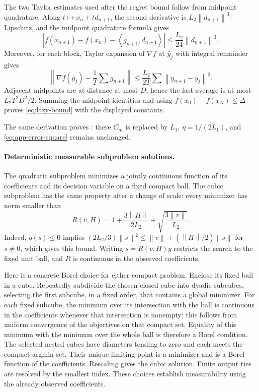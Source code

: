 \documentclass[11pt]{article}
\theoremstyle{remark}
\theoremstyle{remark}
\newcommand{\norm}[1]{\left\lVert#1\right\rVert}
\newcommand{\ip}[2]{\left\langle#1,#2\right\rangle}
\begin{document}
The two Taylor estimates used after the regret bound follow from midpoint
quadrature. Along $t\mapsto x_n+td_{n+1}$, the second derivative is
$L_2\norm{d_{n+1}}^3$-Lipschitz, and the midpoint quadrature formula gives
\[
 \left|f(x_{n+1})-f(x_n)-\ip{g_{n+1}}{d_{n+1}}\right|
 \le \frac{L_2}{24}\norm{d_{n+1}}^3.
\]
Moreover, for each block, Taylor expansion of $\nabla f$ at $\bar y_j$
with integral remainder gives
\[
 \left\|\nabla f(\bar y_j)-\frac{1}{T}\sum g_{n+1}\right\|
 \le \frac{L_2}{2T}\sum\norm{y_{n+1}-\bar y_j}^2.
\]
Adjacent midpoints are at distance at most $D$, hence the last average is
at most $L_2T^2D^2/2$.  Summing the midpoint identities and using
$f(x_0)-f(x_N)\le\Delta$ proves \eqref{eq:lazy-bound} with the displayed
constants.

The same derivation proves : there
$C_m$ is replaced by $L_1$, $\eta=1/(2L_1)$, and
\eqref{eq:app-error-square} remains unchanged.

\paragraph{Deterministic measurable subproblem solutions.}
The quadratic subproblem minimizes a jointly continuous function of its
coefficients and its decision variable on a fixed compact ball.
The cubic subproblem has the same property after a change of scale:
every minimizer has norm smaller than
\[
 R(v,H)=1+\frac{3\norm H}{2L_2}
              +\sqrt{\frac{3\norm v}{L_2}}.
\]
Indeed, $q(s)\le0$ implies
$(2L_2/3)\norm s^2\le\norm v+(\norm H/2)\norm s$ for $s\ne0$,
which gives this bound. Writing $s=R(v,H)y$ restricts the search to
the fixed unit ball, and $R$ is continuous in the observed coefficients.

Here is a concrete Borel choice for either compact problem. Enclose its
fixed ball in a cube. Repeatedly subdivide the chosen closed cube into
dyadic subcubes, selecting the first subcube, in a fixed order, that
contains a global minimizer. For each fixed subcube, the minimum over its
intersection with the ball is continuous in the coefficients whenever
that intersection is nonempty; this follows from uniform convergence of
the objectives on that compact set. Equality of this minimum with the
minimum over the whole ball is therefore a Borel condition. The selected
nested cubes have diameters tending to zero and each meets the compact
argmin set. Their unique limiting point is a minimizer and is a Borel
function of the coefficients. Rescaling gives the cubic solution.
Finite output ties are resolved by the smallest index. These choices
establish measurability using the already observed coefficients.
\end{document}
